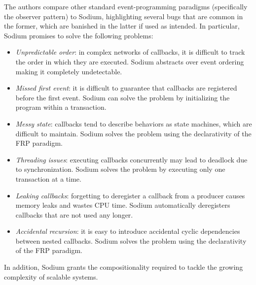 The authors compare other standard event-programming paradigms (specifically
the observer pattern) to Sodium, highlighting several bugs that are common in
the former, which are banished in the latter if used as intended. In
particular, Sodium promises to solve the following problems:
\begin{itemize}
  \item \textit{Unpredictable order}: in complex networks of callbacks, it is
        difficult to track the order in which they are executed. Sodium
        abstracts over event ordering making it completely undetectable.
  \item \textit{Missed first event}: it is difficult to guarantee that
        callbacks are registered before the first event. Sodium can solve the
        problem by initializing the program within a transaction.
  \item \textit{Messy state}: callbacks tend to describe behaviors as state
        machines, which are difficult to maintain. Sodium solves the problem
        using the declarativity of the \ac{FRP} paradigm.
  \item \textit{Threading issues}: executing callbacks concurrently may lead to
        deadlock due to synchronization. Sodium solves the problem by executing
        only one transaction at a time.
  \item \textit{Leaking callbacks}: forgetting to deregister a callback from
        a producer causes memory leaks and wastes CPU time. Sodium
        automatically deregisters callbacks that are not used any longer.
  \item \textit{Accidental recursion}: it is easy to introduce accidental
        cyclic dependencies between nested callbacks. Sodium solves the problem
        using the declarativity of the \ac{FRP} paradigm.
\end{itemize}
In addition, Sodium grants the compositionality required to tackle the growing
complexity of scalable systems.
